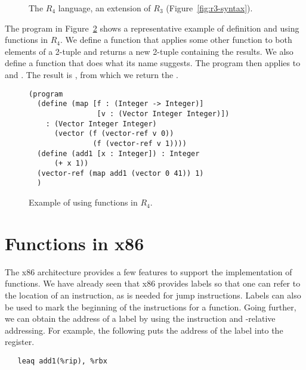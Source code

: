 \documentclass[11pt]{book}
\begin{document}
\begin{figure}[tbp]
\centering
{}
\caption{The $R_4$ language, an extension of $R_3$
  (Figure~\ref{fig:r3-syntax}).}
\label{fig:r4-syntax}
\end{figure}

The program in Figure~\ref{fig:r4-function-example} shows a
representative example of definition and using functions in $R_4$.  We
define a function  that applies some other function 
to both elements of a 2-tuple and returns a new 2-tuple containing the
results. We also define a function  that does what its name
suggests. The program then applies  to  and
.  The result is , from which
we return the .

\begin{figure}[tbp]
\begin{lstlisting}
(program
  (define (map [f : (Integer -> Integer)]
                [v : (Vector Integer Integer)])
    : (Vector Integer Integer)
      (vector (f (vector-ref v 0)) 
               (f (vector-ref v 1))))
  (define (add1 [x : Integer]) : Integer
      (+ x 1))
  (vector-ref (map add1 (vector 0 41)) 1)
  )
\end{lstlisting}
\caption{Example of using functions in $R_4$.}
\label{fig:r4-function-example}
\end{figure}




\section{Functions in x86}

The x86 architecture provides a few features to support the
implementation of functions. We have already seen that x86 provides
labels so that one can refer to the location of an instruction, as is
needed for jump instructions. Labels can also be used to mark the
beginning of the instructions for a function.  Going further, we can
obtain the address of a label by using the  instruction and
-relative addressing. For example, the following puts the
address of the  label into the  register.
\begin{lstlisting}
   leaq add1(%rip), %rbx
\end{lstlisting}
\end{document}
